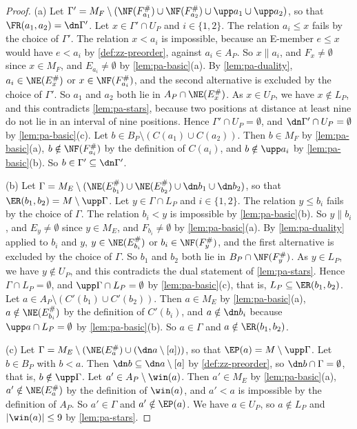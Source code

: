 \begin{proof}
(a) Let $\Gamma' = M_F \setminus (\NF(F^\#_{a_1}) \cup \NF(F^\#_{a_2}) \cup \upp a_1 \cup \upp a_2)$, so that $\FR(a_1, a_2) = \dn \Gamma'$.
Let $x \in \Gamma' \cap U_P$ and $i \in \{1, 2\}$.
The relation $a_i \leq x$ fails by the choice of $\Gamma'$.
The relation $x < a_i$ is impossible, because an E-member $e \leq x$ would have $e < a_i$ by \cref{def:zz-preorder}, against $a_i \in A_P$.
So $x \parallel a_i$, and $F_x \neq \emptyset$ since $x \in M_F$, and $E_{a_i} \neq \emptyset$ by \cref{lem:pa-basic}(a).
By \cref{lem:pa-duality}, $a_i \in \NE(E^\#_x)$ or $x \in \NF(F^\#_{a_i})$, and the second alternative is excluded by the choice of $\Gamma'$.
So $a_1$ and $a_2$ both lie in $A_P \cap \NE(E^\#_x)$.
As $x \in U_P$, we have $x \notin L_P$, and this contradicts \cref{lem:pa-stars}, because two positions at distance at least nine do not lie in an interval of nine positions.
Hence $\Gamma' \cap U_P = \emptyset$, and $\dn \Gamma' \cap U_P = \emptyset$ by \cref{lem:pa-basic}(c).
Let $b \in B_P \setminus (C(a_1) \cup C(a_2))$.
Then $b \in M_F$ by \cref{lem:pa-basic}(a), $b \notin \NF(F^\#_{a_i})$ by the definition of $C(a_i)$, and $b \notin \upp a_i$ by \cref{lem:pa-basic}(b).
So $b \in \Gamma' \subseteq \dn \Gamma'$.

(b) Let $\Gamma = M_E \setminus (\NE(E^\#_{b_1}) \cup \NE(E^\#_{b_2}) \cup \dn b_1 \cup \dn b_2)$, so that $\ER(b_1, b_2) = M \setminus \upp \Gamma$.
Let $y \in \Gamma \cap L_P$ and $i \in \{1, 2\}$.
The relation $y \leq b_i$ fails by the choice of $\Gamma$.
The relation $b_i < y$ is impossible by \cref{lem:pa-basic}(b).
So $y \parallel b_i$, and $E_y \neq \emptyset$ since $y \in M_E$, and $F_{b_i} \neq \emptyset$ by \cref{lem:pa-basic}(a).
By \cref{lem:pa-duality} applied to $b_i$ and $y$, $y \in \NE(E^\#_{b_i})$ or $b_i \in \NF(F^\#_y)$, and the first alternative is excluded by the choice of $\Gamma$.
So $b_1$ and $b_2$ both lie in $B_P \cap \NF(F^\#_y)$.
As $y \in L_P$, we have $y \notin U_P$, and this contradicts the dual statement of \cref{lem:pa-stars}.
Hence $\Gamma \cap L_P = \emptyset$, and $\upp \Gamma \cap L_P = \emptyset$ by \cref{lem:pa-basic}(c), that is, $L_P \subseteq \ER(b_1, b_2)$.
Let $a \in A_P \setminus (C'(b_1) \cup C'(b_2))$.
Then $a \in M_E$ by \cref{lem:pa-basic}(a), $a \notin \NE(E^\#_{b_i})$ by the definition of $C'(b_i)$, and $a \notin \dn b_i$ because $\upp a \cap L_P = \emptyset$ by \cref{lem:pa-basic}(b).
So $a \in \Gamma$ and $a \notin \ER(b_1, b_2)$.

(c) Let $\Gamma = M_E \setminus (\NE(E^\#_a) \cup (\dn a \setminus [a]))$, so that $\EP(a) = M \setminus \upp \Gamma$.
Let $b \in B_P$ with $b < a$.
Then $\dn b \subseteq \dn a \setminus [a]$ by \cref{def:zz-preorder}, so $\dn b \cap \Gamma = \emptyset$, that is, $b \notin \upp \Gamma$.
Let $a' \in A_P \setminus \win(a)$.
Then $a' \in M_E$ by \cref{lem:pa-basic}(a), $a' \notin \NE(E^\#_a)$ by the definition of $\win(a)$, and $a' < a$ is impossible by the definition of $A_P$.
So $a' \in \Gamma$ and $a' \notin \EP(a)$.
We have $a \in U_P$, so $a \notin L_P$ and $|\win(a)| \leq 9$ by \cref{lem:pa-stars}.


\end{proof}
